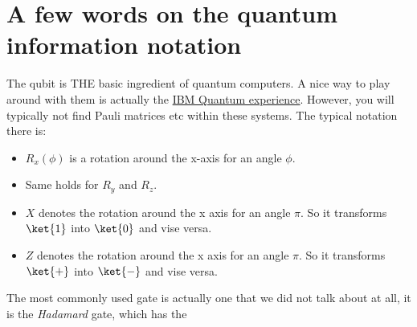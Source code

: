 \section{A few words on the quantum information notation}

The qubit is THE basic ingredient of quantum computers. A nice way to play around with them is actually the \href{https://quantum-computing.ibm.com/}{IBM Quantum experience}. However, you will typically not find Pauli matrices etc within these systems. The typical notation there is:
\begin{itemize}
\item $R_x(\phi)$ is a rotation around the x-axis for an angle $\phi$.
\item Same holds for $R_y$ and $R_z$.
\item $X$ denotes the rotation around the x axis for an angle $\pi$. So it transforms $\ket{1}$ into  $\ket{0}$ and vise versa.
\item $Z$ denotes the rotation around the x axis for an angle $\pi$. So it transforms $\ket{+}$ into  $\ket{-}$ and vise versa.
\end{itemize}
The most commonly used gate is actually one that we did not talk about at all, it is the \textit{Hadamard} gate, which has the 